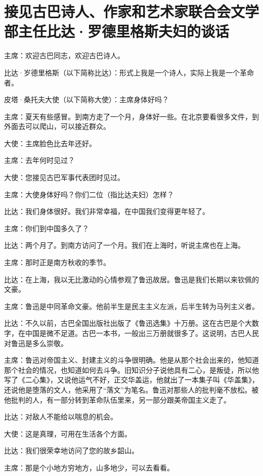 \section[接见古巴诗人、作家和艺术家联合会文学部主任比达·罗德里格斯夫妇的谈话（一九六三年十一月二十六日）]{接见古巴诗人、作家和艺术家联合会文学部主任比达·罗德里格斯夫妇的谈话}


主席：欢迎古巴同志，欢迎古巴诗人。

比达·岁德里格斯（以下简称比达）：形式上我是一个诗人，实际上我是一个革命者。

皮塔·桑托夫大使（以下简称大使）：主席身体好吗？

主席：夏天有些感冒。到南方走了一个月，身体好一些。在北京要看很多文件，到外面去可以爬山，可以接近群众。

大使：主席脸色比去年还好。

主席：去年何时见过？

大使：您接见古巴军事代表团时见过。

主席：大使身体好吗？你们二位（指比达夫妇）怎样？

比达：我们身体很好。我们非常幸福，在中国我们变得更年轻了。

主席：你们到中国多久了？

比达：两个月了。到南方访问了一个月。我们在上海时，听说主席也在上海。

主席：那时正是南方秋收的季节。

比达：在上海，我以无比激动的心情参观了鲁迅故居。鲁迅是我们长期以来钦佩的文豪。

主席：鲁迅是中同革命文豪。他前半生是民主主义左派，后半生转为马列主义者。

比达：不久以前，古巴全国出版社出版了《鲁迅选集》十万册。这在古巴是个大数字，在中国是微不足道。古巴一本书，一般出三万册就很多了。这说明，古巴人民对鲁迅是多么崇敬。

主席：鲁迅对帝国主义、封建主义的斗争很明确。他是从那个社会出来的，他知道那个社会的情况，也知道如何去斗争。旧知识分子说他具有二心，是叛徒，所以他写了《二心集》，又说他运气不好，正交华盖运，他就出了一本集子叫《华盖集》，还说他是堕落的文人，他采用了“落文”为笔名。鲁迅对那些人的批判毫不放松。被他批判的人，有一部分转到革命队伍里来，另一部分跟美帝国主义走了。

比达：对敌人不能给以喘息的机会。

大使：这是真理，可用在生活各个方面。

比达：我们很荣幸地访问了您的故乡韶山。

主席：那是个小地方穷地方，山多地少，可以去看看。

